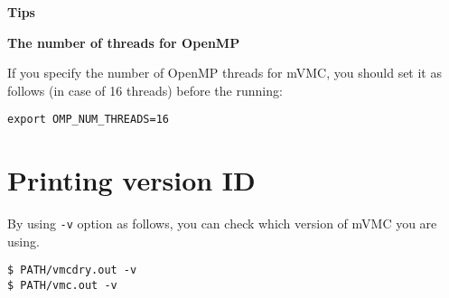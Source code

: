 \begin{screen}
\Large 
{\bf Tips}
\normalsize

{\bf The number of threads for OpenMP}

If you specify the number of OpenMP threads for mVMC,
you should set it as follows (in case of 16 threads) before the running:
\begin{verbatim}
export OMP_NUM_THREADS=16
\end{verbatim}

\end{screen}

\section{Printing version ID}

By using \verb|-v| option as follows, 
you can check which version of mVMC you are using.

\begin{verbatim}
$ PATH/vmcdry.out -v
$ PATH/vmc.out -v
\end{verbatim}
